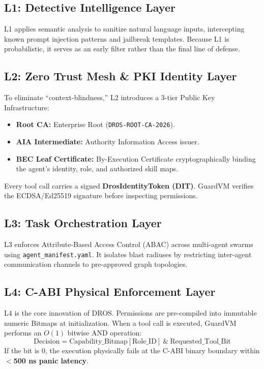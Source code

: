 \documentclass[conference]{IEEEtran}
\begin{document}
\subsection{L1: Detective Intelligence Layer}
L1 applies semantic analysis to sanitize natural language inputs, intercepting known prompt injection patterns and jailbreak templates. Because L1 is probabilistic, it serves as an early filter rather than the final line of defense.

\subsection{L2: Zero Trust Mesh \& PKI Identity Layer}
To eliminate ``context-blindness,'' L2 introduces a 3-tier Public Key Infrastructure:
\begin{itemize}
    \item \textbf{Root CA:} Enterprise Root (\texttt{DROS-ROOT-CA-2026}).
    \item \textbf{AIA Intermediate:} Authority Information Access issuer.
    \item \textbf{BEC Leaf Certificate:} By-Execution Certificate cryptographically binding the agent's identity, role, and authorized skill maps.
\end{itemize}
Every tool call carries a signed \textbf{DrosIdentityToken (DIT)}. GuardVM verifies the ECDSA/Ed25519 signature before inspecting permissions.

\subsection{L3: Task Orchestration Layer}
L3 enforces Attribute-Based Access Control (ABAC) across multi-agent swarms using \texttt{agent\_manifest.yaml}. It isolates blast radiuses by restricting inter-agent communication channels to pre-approved graph topologies.

\subsection{L4: C-ABI Physical Enforcement Layer}
L4 is the core innovation of DROS. Permissions are pre-compiled into immutable numeric Bitmaps at initialization. When a tool call is executed, GuardVM performs an $O(1)$ bitwise AND operation:
\begin{equation}
\text{Decision} = \text{Capability\_Bitmap}[\text{Role\_ID}] \ \text{\&} \ \text{Requested\_Tool\_Bit}
\end{equation}
If the bit is $0$, the execution physically fails at the C-ABI binary boundary within \textbf{$<$500 ns panic latency}.
\end{document}

